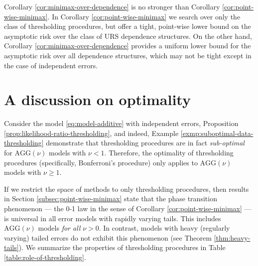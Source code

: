 \begin{remark}
Corollary \ref{cor:minimax-over-dependence} is no stronger than Corollary \ref{cor:point-wise-minimax}. 
In Corollary \ref{cor:point-wise-minimax} we search over only the class of thresholding procedures, but offer a tight, point-wise lower bound on the asymptotic risk over the class of URS dependence structures.
On the other hand, Corollary \ref{cor:minimax-over-dependence} provides a uniform lower bound for the asymptotic risk over all dependence structures, which may not be tight except in the case of independent errors.
\end{remark}




\section{A discussion on optimality}

 

Consider the model \eqref{eq:model-additive} with independent errors, Proposition \ref{prop:likelihood-ratio-thresholding}, and indeed, Example \ref{exmp:suboptimal-data-thresholding} demonstrate that thresholding procedures are in fact \emph{sub-optimal} for $\text{AGG}(\nu)$ models with $\nu<1$.
Therefore, the optimality of thresholding procedures (specifically, Bonferroni's procedure) only applies to $\text{AGG}(\nu)$ models with $\nu\ge1$. 

If we restrict the space of methods to only thresholding procedures, then results in Section \ref{subsec:point-wise-minimax} state that the phase transition phenomenon --- the 0-1 law in the sense of Corollary \ref{cor:point-wise-minimax} --- is universal in all error models with rapidly varying tails.
This includes $\text{AGG}(\nu)$ models {\it for all} $\nu>0$.
In contrast, models with heavy (regularly varying) tailed errors do not exhibit this phenomenon (see Theorem \ref{thm:heavy-tails}).
We summarize the properties of thresholding procedures in Table \ref{table:role-of-thresholding}. 


